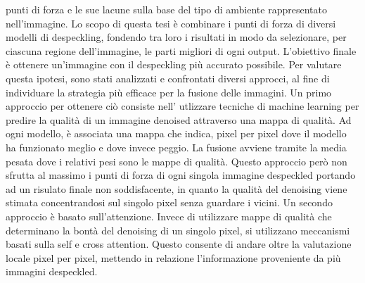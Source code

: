 punti di forza e le sue lacune sulla base del tipo di ambiente rappresentato nell'immagine. 
Lo scopo di questa tesi è combinare i punti di forza di diversi modelli di despeckling, 
fondendo tra loro i risultati in modo da selezionare, per ciascuna regione dell’immagine, le parti 
migliori di ogni output. L’obiettivo finale è ottenere un’immagine con il despeckling più accurato possibile.
Per valutare questa ipotesi, sono stati analizzati e confrontati diversi approcci, al fine di individuare la strategia più efficace per la fusione delle immagini.
Un primo approccio per ottenere ciò consiste nell' utlizzare tecniche di machine learning
per predire la qualità di un immagine denoised attraverso una mappa di qualità. Ad ogni modello,
è associata una mappa che indica, pixel per pixel dove il modello ha funzionato meglio e 
dove invece peggio. La fusione avviene tramite la media pesata dove i relativi pesi 
sono le mappe di qualità. Questo approccio però non sfrutta al massimo i punti di forza 
di ogni singola immagine despeckled portando ad un risulato finale non soddisfacente, 
in quanto la qualità del denoising viene stimata concentrandosi sul singolo pixel senza 
guardare i vicini. Un secondo approccio è basato sull’attenzione. Invece 
di utilizzare mappe di qualità che determinano la bontà del denoising di un singolo 
pixel, si utilizzano meccanismi basati sulla self e cross attention. Questo consente di andare oltre 
la valutazione locale pixel per pixel, mettendo in relazione l’informazione proveniente 
da più immagini despeckled.
\medskip

